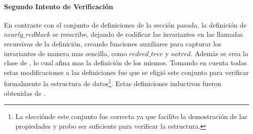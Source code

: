 \paragraph{Segundo Intento de Verificaci\'on}
En contraste con el conjunto de definiciones de la secci\'on pasada, la definici\'on de
\hyperref[inductive_isRedB]{$nearly\_redblack$} se reescribe, dejando de codificar las invariantes 
en las llamadas recursivas de la definición, creando funciones auxiliares para capturar los 
invariantes de manera mas sencilla, como \hyperref[inductive_isRedB]{$redred\_tree$} y $notred$. 
Además se crea la clase de {\arns}, lo cual afina mas la definici\'on de los mismos. Tomando en 
cuenta todas estas modificaciones a las definiciones fue que se eligió este conjunto para verificar 
formalmente la estructura de datos\footnote{La elecci\'onde este conjunto fue correcta ya que 
facilito la demostraci\'on de las propiedades y probo ser suficiente para verificar la estructura.}. 
Estas definiciones inductivas fueron obtenidas de \cite{MSetRBT}.
